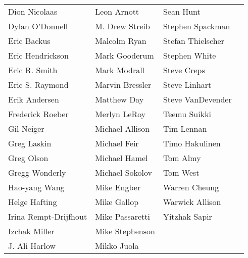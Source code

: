 \begin{center}
\begin{tabular}{llll}
Dion Nicolaas & Leon Arnott & Sean Hunt\\
Dylan O'Donnell & M. Drew Streib & Stephen Spackman\\
Eric Backus & Malcolm Ryan & Stefan Thielscher\\
Eric Hendrickson & Mark Gooderum & Stephen White\\
Eric R. Smith & Mark Modrall & Steve Creps\\
Eric S. Raymond & Marvin Bressler & Steve Linhart\\
Erik Andersen & Matthew Day & Steve VanDevender\\
Frederick Roeber & Merlyn LeRoy & Teemu Suikki\\
Gil Neiger & Michael Allison & Tim Lennan\\
Greg Laskin & Michael Feir & Timo Hakulinen\\
Greg Olson & Michael Hamel & Tom Almy\\
Gregg Wonderly & Michael Sokolov & Tom West\\
Hao-yang Wang & Mike Engber & Warren Cheung\\
Helge Hafting & Mike Gallop & Warwick Allison\\
Irina Rempt-Drijfhout & Mike Passaretti & Yitzhak Sapir\\
Izchak Miller & Mike Stephenson\\
J. Ali Harlow & Mikko Juola
\end{tabular}
\end{center}
\clearpage


